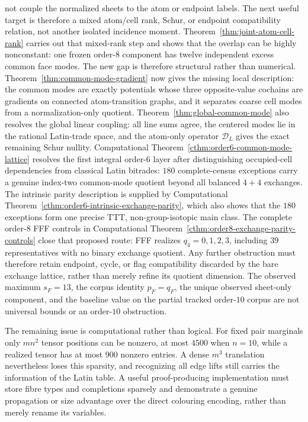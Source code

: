 not couple the normalized sheets to the atom or endpoint labels.  The next
useful target is therefore a mixed atom/cell rank, Schur, or endpoint
compatibility relation, not another isolated incidence moment.
Theorem~\ref{thm:joint-atom-cell-rank} carries out that mixed-rank step and
shows that the overlap can be highly nonconstant: one frozen order-$8$
component has twelve independent excess common face modes.  The new gap is
therefore structural rather than numerical.
Theorem~\ref{thm:common-mode-gradient} now gives the missing local
description: the common modes are exactly potentials whose three
opposite-value cochains are gradients on connected atom-transition graphs,
and it separates coarse cell modes from a normalization-only quotient.
Theorem~\ref{thm:global-common-mode} also resolves the global linear coupling:
all line sums agree, the centered modes lie in the rational Latin-trade
space, and the atom-only operator $\mathcal D_L$ gives the exact remaining
Schur nullity.  Computational
Theorem~\ref{cthm:order6-common-mode-lattice} resolves the first integral
order-$6$ layer after distinguishing occupied-cell dependencies from
classical Latin bitrades: $180$ complete-census exceptions carry a genuine
index-two common-mode quotient beyond all balanced $4+4$ exchanges.  The
intrinsic parity description is supplied by Computational
Theorem~\ref{cthm:order6-intrinsic-exchange-parity}, which also shows that the
$180$ exceptions form one precise TTT, non-group-isotopic main class.  The
complete order-$8$ FFF controls in Computational
Theorem~\ref{cthm:order8-exchange-parity-controls} close that proposed route:
FFF realizes $q_4=0,1,2,3$, including $39$ representatives with no binary
exchange quotient.  Any further obstruction must therefore retain endpoint,
cycle, or flag compatibility discarded by the bare exchange lattice, rather
than merely refine its quotient dimension.  The observed maximum $s_F=13$, the
corpus identity $p_F=q_F$, the unique observed sheet-only component, and the
baseline value on the partial tracked order-$10$ corpus are not universal
bounds or an order-$10$ obstruction.

The remaining issue is computational rather than logical.  For fixed pair
marginals only $mn^2$ tensor positions can be nonzero, at most $4500$ when
$n=10$, while a realized tensor has at most $900$ nonzero entries.  A dense
$m^3$ translation nevertheless loses this sparsity, and recognizing all edge
lifts still carries the information of the Latin table.  A useful
proof-producing implementation must store fibre types and completions
sparsely and demonstrate a genuine propagation or size advantage over the
direct colouring encoding, rather than merely rename its variables.

